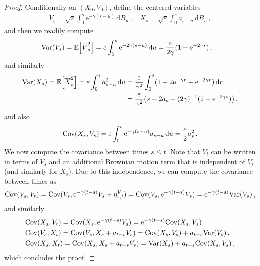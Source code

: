 \documentclass[12pt]{article}
\theoremstyle{plain}
\theoremstyle{plain}
\theoremstyle{remark}
\newcommand{\dd}{\,\mathrm{d}}
\newcommand{\rme}{\mathrm{e}}
\newcommand{\eps}{\varepsilon}
\newcommand{\bb}{\mathbb}
\newcommand{\1}{\bm{1}}
\theoremstyle{plain}
\theoremstyle{definition}
\theoremstyle{remark}
\begin{document}
\begin{proof}
Conditionally on $(X_0,V_0)$, define the centered variables
\begin{align*}
    \overline{V}_s = \sqrt{\eps}\int_0^s \rme^{-\gamma(s-u)}\dd B_u\,, \quad \overline{X}_s = \sqrt{\eps}\int_0^s a_{s-u}\dd B_u\,,
\end{align*}
and then we readily compute
\begin{align*}
    &{\rm Var}(V_s) = \bb E\Bigl[\overline{V}_s^2\Bigr] = \eps \int_0^s \rme^{-2\gamma(s-u)}\dd u = \frac{\eps}{2\gamma}(1-\rme^{-2\gamma s})\,,
\end{align*}
and similarly
\begin{align*}
{\rm Var}(X_s) = \bb E\Bigl[\overline{X}_s^2\Bigr] = \eps \int_0^s a_{s-u}^2 \dd u  &= \frac{\eps}{\gamma^2}\int_0^s (1 - 2\rme^{-\gamma r} + \rme^{-2\gamma r}) \dd r \\
&= \frac{\eps}{\gamma^2}\bigl(s - 2a_s + (2\gamma)^{-1}(1-\rme^{-2\gamma s}) \bigr)\,,
\end{align*}
and also
\begin{align*}
    {\rm Cov}(X_s,V_s) = \eps \int_0^s \rme^{-\gamma(s-u)} a_{s-u} \dd u = \frac{\eps}{2}a_s^2\,.
\end{align*}
We now compute the covariance between times $s \leq t$. Note that $V_t$ can be written in terms of $V_s$ and an additional Brownian motion term that is independent of $V_s$ (and similarly for $X_s$). Due to this independence, we can compute the covariance between times as
\begin{align*}
    {\rm Cov}(V_s,V_t) = {\rm Cov}(V_s, \rme^{-\gamma (t-s)}V_s + \eta_{s,t}^V) = {\rm Cov}(V_s, \rme^{-\gamma (t-s)}V_s) = \rme^{-\gamma (t-s)}{\rm Var}(V_s)\,,
\end{align*}
and similarly
\begin{align*}
    & {\rm Cov}(X_s,V_t) = {\rm Cov}(X_s, \rme^{-\gamma (t-s)}V_s) = \rme^{-\gamma(t-s)}{\rm Cov}(X_s,V_s)\,, \\
    &{\rm Cov}(V_s,X_t) = {\rm Cov}(V_s, X_s + a_{t-s}V_s) = {\rm Cov}(X_s,V_s) + a_{t-s}{\rm Var}(V_s)\,, \\
    &{\rm Cov}(X_s,X_t) = {\rm Cov}(X_s, X_s + a_{t-s}V_s) = {\rm Var}(X_s) + a_{t-s}{\rm Cov}(X_s,V_s)\,,
\end{align*}
which concludes the proof.
\end{proof}
\end{document}
